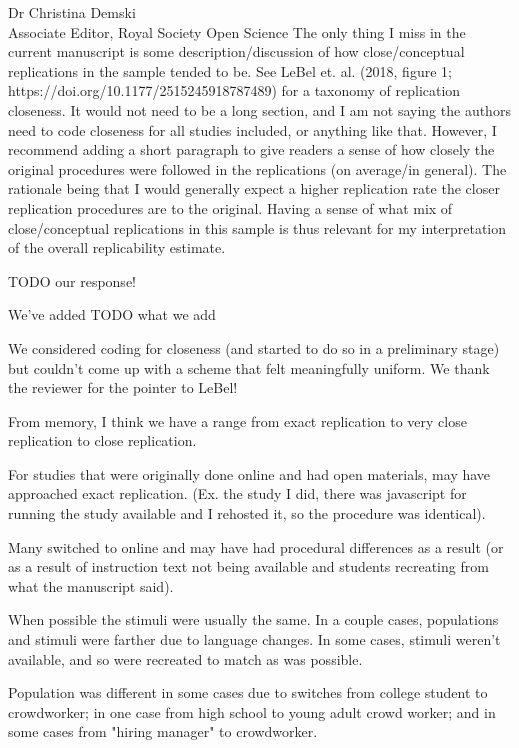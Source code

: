 \documentclass{stanfordletter}
\begin{document}
\begin{letter}{Dr Christina Demski \\ Associate Editor, Royal Society Open Science}
{          The only thing I miss in the current manuscript is some description/discussion of how close/conceptual replications in the sample tended to be. See LeBel et. al. (2018, figure 1; https://doi.org/10.1177/2515245918787489) for a taxonomy of replication closeness. It would not need to be a long section, and I am not saying the authors need to code closeness for all studies included, or anything like that. However, I recommend adding a short paragraph to give readers a sense of how closely the original procedures were followed in the replications (on average/in general). The rationale being that I would generally expect a higher replication rate the closer replication procedures are to the original. Having a sense of what mix of close/conceptual replications in this sample is thus relevant for my interpretation of the overall replicability estimate.}
          
          TODO our response!
          
          We've added TODO what we add
          
          We considered coding for closeness (and started to do so in a preliminary stage) but couldn't come up with a scheme that felt meaningfully uniform. We thank the reviewer for the pointer to LeBel!
          
          From memory, I think we have a range from exact replication to very close replication to close replication. 
          
          For studies that were originally done online and had open materials, may have approached exact replication. (Ex. the study I did, there was javascript for running the study available and I rehosted it, so the procedure was identical). 
          
          Many switched to online and may have had procedural differences as a result (or as a result of instruction text not being available and students recreating from what the manuscript said). 
          
          When possible the stimuli were usually the same. In a couple cases, populations and stimuli were farther due to language changes. In some cases, stimuli weren't available, and so were recreated to match as was possible. 
          
          Population was different in some cases due to switches from college student to crowdworker; in one case from high school to young adult crowd worker; and in some cases from "hiring manager" to crowdworker. 
          

\end{letter}
\end{document}
